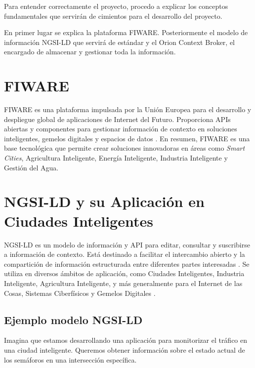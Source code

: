 
Para entender correctamente el proyecto, procedo a explicar los conceptos fundamentales que servirán de cimientos para el desarrollo del proyecto.

En primer lugar se explica la plataforma FIWARE. Posteriormente el modelo de información NGSI-LD que servirá de estándar y el Orion Context Broker, el encargado de almacenar y gestionar toda la información.

\section{FIWARE}
FIWARE es una plataforma impulsada por la Unión Europea para el desarrollo y despliegue 
global de aplicaciones de Internet del Futuro. Proporciona APIs abiertas y componentes para 
gestionar información de contexto en soluciones inteligentes, gemelos digitales y espacios de 
datos \cite{fiware}. En resumen, FIWARE es una base tecnológica que permite crear soluciones 
innovadoras en áreas como \textit{Smart Cities}, Agricultura Inteligente, Energía Inteligente, Industria Inteligente y Gestión del Agua. 

\section{NGSI-LD y su Aplicación en Ciudades Inteligentes}\label{modelo-ngsi-ld}

NGSI-LD es un modelo de información y API para editar, consultar y suscribirse a información de contexto. Está destinado a facilitar el intercambio abierto y la compartición de información estructurada entre diferentes partes interesadas \cite{etsi_ngsi_ld}. Se utiliza en diversos ámbitos de aplicación, como Ciudades Inteligentes, Industria Inteligente, Agricultura Inteligente, y más generalmente para el Internet de las Cosas, Sistemas Ciberfísicos y Gemelos Digitales \cite{etsi_iot}.

\subsection{Ejemplo modelo NGSI-LD}\label{ejemplo-uso-ngsi}
Imagina que estamos desarrollando una aplicación para monitorizar el tráfico en una ciudad inteligente. Queremos obtener información sobre el estado actual de los semáforos en una intersección específica.

